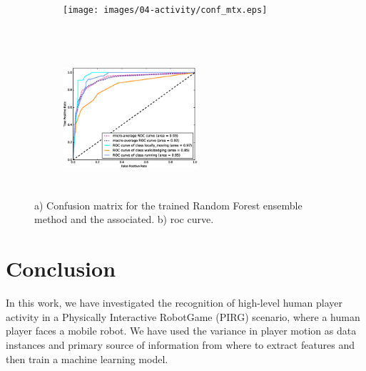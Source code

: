 \begin{figure}[H]
    \centering
    \begin{subfigure}[b]{0.2\textwidth}
       \centering
       \texttt{[image: images/04-activity/conf\_mtx.eps]}
       \caption{}
	\end{subfigure}
	~
    \begin{subfigure}[b]{0.2\textwidth}
     	\centering
        \includegraphics[width=5cm, height=5cm]{images/04-activity/roc.eps}
        \caption{}
	\end{subfigure}
	\caption{a) Confusion matrix for the trained Random Forest ensemble method and the associated. b) \gls{roc} curve.}\label{fig:mtx-roc}
\end{figure}

\section{Conclusion}
In this work, we have investigated the recognition of high-level human player activity in a Physically Interactive RobotGame (PIRG) scenario, where a human player faces a mobile robot. We have used the variance in player motion as data instances and primary source of information from where to extract features and then train a machine learning model. 

